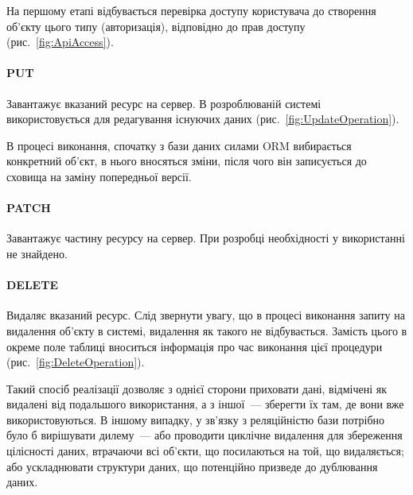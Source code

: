 На першому етапі відбувається перевірка доступу користувача до створення об’єкту цього типу (авторизація), відповідно до прав доступу (рис.~\ref{fig:ApiAccess}).

\paragraph{PUT}

Завантажує вказаний ресурс на сервер. В розроблюваній системі використовується для редагування існуючих даних (рис.~\ref{fig:UpdateOperation}). 

В процесі виконання, спочатку з бази даних силами ORM вибирається конкретний об’єкт, в нього вносяться зміни, після чого він записується до сховища на заміну попередньої версії.

\paragraph{PATCH}

Завантажує частину ресурсу на сервер. При розробці необхідності у використанні не знайдено.

\paragraph{DELETE}

Видаляє вказаний ресурс.
Слід звернути увагу, що в процесі виконання запиту на видалення об’єкту в системі, видалення як такого не відбувається. Замість цього в окреме поле таблиці вноситься інформація про час виконання цієї процедури (рис.~\ref{fig:DeleteOperation}).

Такий спосіб реалізації дозволяє з однієї сторони приховати дані, відмічені як видалені від подальшого використання, а з іншої~--- зберегти їх там, де вони вже використовуються. В іншому випадку, у зв’язку з реляційністю бази потрібно було б вирішувати дилему~--- або проводити циклічне видалення для збереження цілісності даних, втрачаючи всі об’єкти, що посилаються на той, що видаляється; або ускладнювати структури даних, що потенційно призведе до дублювання даних.

